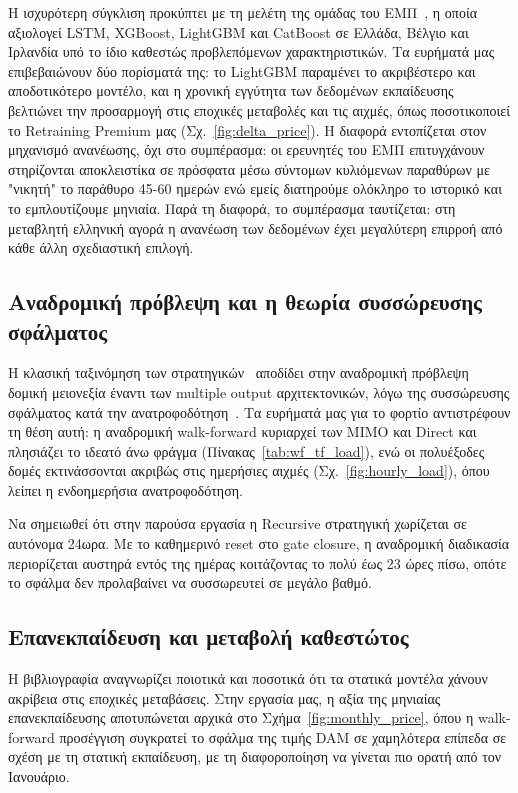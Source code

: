 Η ισχυρότερη σύγκλιση προκύπτει με τη μελέτη της ομάδας του ΕΜΠ~\cite{ntua2025shortwindow},
η οποία αξιολογεί LSTM, XGBoost, LightGBM και CatBoost σε Ελλάδα, Βέλγιο και Ιρλανδία
υπό το ίδιο καθεστώς προβλεπόμενων χαρακτηριστικών. Τα ευρήματά μας επιβεβαιώνουν δύο
πορίσματά της: το LightGBM παραμένει το ακριβέστερο και αποδοτικότερο μοντέλο, και η χρονική
εγγύτητα των δεδομένων εκπαίδευσης βελτιώνει την προσαρμογή στις εποχικές μεταβολές
και τις αιχμές, όπως ποσοτικοποιεί το Retraining Premium μας (Σχ.~\ref{fig:delta_price}).
Η διαφορά εντοπίζεται στον μηχανισμό ανανέωσης, όχι στο συμπέρασμα: οι ερευνητές του ΕΜΠ επιτυγχάνουν
στηρίζονται αποκλειστίκα σε πρόσφατα μέσω σύντομων κυλιόμενων παραθύρων με "νικητή" το παράθυρο 45-60 ημερών
ενώ εμείς διατηρούμε ολόκληρο το ιστορικό και το εμπλουτίζουμε μηνιαία. Παρά τη διαφορά, το συμπέρασμα ταυτίζεται: στη μεταβλητή
ελληνική αγορά η ανανέωση των δεδομένων έχει μεγαλύτερη επιρροή από κάθε άλλη σχεδιαστική
επιλογή.

\subsection{Αναδρομική πρόβλεψη και η θεωρία συσσώρευσης σφάλματος}
\label{subsec:rec_vs_taieb}

Η κλασική ταξινόμηση των στρατηγικών~\cite{taieb2012review,bontempi2012strategies}
αποδίδει στην αναδρομική πρόβλεψη δομική μειονεξία έναντι των multiple output
αρχιτεκτονικών, λόγω της συσσώρευσης σφάλματος κατά την
ανατροφοδότηση~\cite{bento2024mimo}. Τα ευρήματά μας για το φορτίο αντιστρέφουν τη
θέση αυτή: η αναδρομική walk-forward κυριαρχεί των MIMO και Direct και πλησιάζει το
ιδεατό άνω φράγμα (Πίνακας~\ref{tab:wf_tf_load}), ενώ οι πολυέξοδες δομές
εκτινάσσονται ακριβώς στις ημερήσιες αιχμές (Σχ.~\ref{fig:hourly_load}), όπου λείπει
η ενδοημερήσια ανατροφοδότηση. 

Nα σημειωθεί ότι στην παρούσα εργασία η Recursive στρατηγική χωρίζεται σε αυτόνομα 24ωρα. Με το καθημερινό reset στο gate closure, η αναδρομική διαδικασία περιορίζεται αυστηρά εντός της ημέρας κοιτάζοντας το πολύ έως 23 ώρες πίσω, οπότε το σφάλμα δεν προλαβαίνει να συσσωρευτεί σε μεγάλο βαθμό.

\subsection{Επανεκπαίδευση και μεταβολή καθεστώτος}
\label{subsec:retrain_regime}

Η βιβλιογραφία αναγνωρίζει ποιοτικά και ποσοτικά ότι τα στατικά μοντέλα χάνουν ακρίβεια στις εποχικές μεταβάσεις. Στην εργασία μας, η αξία της μηνιαίας επανεκπαίδευσης αποτυπώνεται αρχικά στο Σχήμα~\ref{fig:monthly_price}, όπου η walk-forward προσέγγιση συγκρατεί το σφάλμα της τιμής DAM σε χαμηλότερα επίπεδα σε σχέση με τη στατική εκπαίδευση, με τη διαφοροποίηση να γίνεται πιο ορατή από τον Ιανουάριο.

